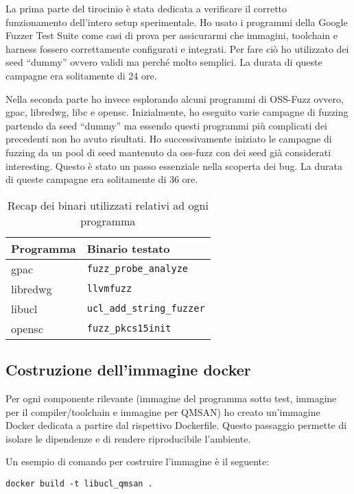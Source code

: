 La prima parte del tirocinio è stata dedicata a verificare il corretto funzionamento dell’intero setup sperimentale. Ho usato i programmi della Google Fuzzer Test Suite come casi di prova per assicurarmi che immagini, toolchain e harness fossero correttamente configurati e integrati. Per fare ciò ho utilizzato dei seed “dummy” ovvero validi ma perché molto semplici. La durata di queste campagne era solitamente di 24 ore.

Nella seconda parte ho invece esplorando alcuni programmi di OSS-Fuzz ovvero, gpac, libredwg, libc e opensc. Inizialmente, ho eseguito varie campagne di fuzzing partendo da seed “dummy” ma essendo questi programmi più complicati dei precedenti non ho avuto risultati. Ho successivamente iniziato le campagne di fuzzing da un pool di seed mantenuto da oss-fuzz con dei seed già considerati interesting. Questo è stato un passo essenziale nella scoperta dei bug. La durata di queste campagne era solitamente di 36 ore. 

\begin{table}[ht]
  \centering
  \caption{Recap dei binari utilizzati relativi ad ogni programma}
  \label{tab:recap-binari}
  \begin{tabular}{ll}
    \toprule
    \textbf{Programma} & \textbf{Binario testato} \\
    \midrule
    gpac    & \texttt{fuzz\_probe\_analyze} \\
    libredwg & \texttt{llvmfuzz} \\
    libucl  & \texttt{ucl\_add\_string\_fuzzer} \\
    opensc  & \texttt{fuzz\_pkcs15init} \\
    \bottomrule
  \end{tabular}
\end{table}

\subsection{Costruzione dell'immagine docker}

Per ogni componente rilevante (immagine del programma sotto test, immagine per il compiler/toolchain e immagine per QMSAN) ho creato un’immagine Docker dedicata a partire dal rispettivo Dockerfile. 
Questo passaggio permette di isolare le dipendenze e di rendere riproducibile l’ambiente.

Un esempio di comando per costruire l’immagine è il seguente:

\begin{center}
\texttt{docker build -t libucl\_qmsan .}
\end{center}

